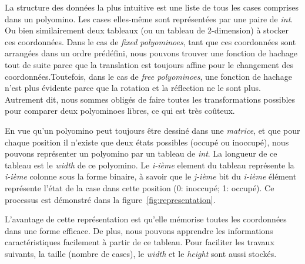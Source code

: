 \documentclass[a4paper,12pt]{article}
\begin{document}
	\par La structure des données la plus intuitive est une liste de tous les cases comprises dans un polyomino. Les cases elles-même sont représentées par une paire de \textit{int}. Ou bien similairement deux tableaux (ou un tableau de 2-dimension) à stocker ces coordonnées. Dans le cas de \textit{fixed polyominoes}, tant que ces coordonnées sont arrangées dans un ordre prédéfini, nous pouvons trouver une fonction de hachage tout de suite parce que la translation est toujours affine pour le changement des coordonnées.Toutefois, dans le cas de \textit{free polyominoes}, une fonction de hachage n'est plus évidente parce que la rotation et la réflection ne le sont plus. Autrement dit, nous sommes obligés de faire toutes les transformations possibles pour comparer deux polyominoes libres, ce qui est très coûteux.
	\par En vue qu'un polyomino peut toujours être dessiné dans une \textit{matrice}, et que pour chaque position il n'existe que deux états possibles (occupé ou inoccupé), nous pouvons représenter un polyomino par un tableau de \textit{int}. La longueur de ce tableau est le \textit{width} de ce polyomino. Le \textit{i-ième} element du tableau représente la \textit{i-ième} colonne sous la forme binaire, à savoir que le \textit{j-ième} bit du \textit{i-ième} élément représente l'état de la case dans cette position (0: inoccupé; 1: occupé). Ce processus est démonstré dans la figure~\ref{fig:representation}.
	\par L'avantage de cette représentation est qu'elle mémorise toutes les coordonnées dans une forme efficace. De plus, nous pouvons apprendre les informations caractéristiques facilement à partir de ce tableau. Pour faciliter les travaux suivants, la taille (nombre de cases), le \textit{width} et le \textit{height} sont aussi stockés.
\end{document}
